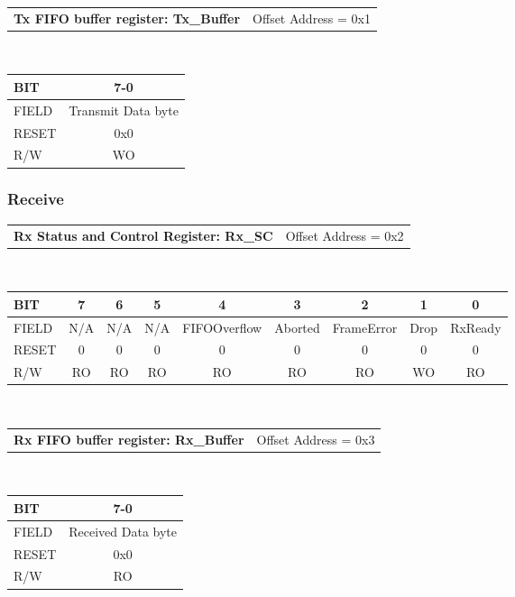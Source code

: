 \documentclass[a4paper,11pt]{article}
\begin{document}
\begin{tabular}{l l}
\textbf{Tx FIFO buffer register: Tx\_Buffer} & Offset Address = 0x1\\
\end{tabular}\\
 
\begin{tabular}{|l||c|}
\hline
\hline
BIT   & 7-0\\ 
\hline
FIELD & Transmit Data byte\\
\hline
RESET & 0x0\\
\hline
R/W   & WO\\
\hline
\end{tabular}
 
\subsubsection{Receive}
 
\begin{tabular}{l l}
\textbf{Rx Status and Control Register: Rx\_SC} & Offset Address = 0x2\\
\end{tabular}\\
 
\begin{tabular}{|l||c|c|c|c|c|c|c|c|}
\hline
\hline
BIT   & 7 & 6 & 5 & 4 & 3 & 2 & 1 & 0\\ 
\hline
FIELD &N/A &N/A &N/A & FIFOOverflow& Aborted& FrameError& Drop& RxReady\\
\hline
RESET & 0& 0& 0& 0& 0& 0& 0& 0\\
\hline
R/W   & RO& RO& RO&   RO&  RO&   RO&  WO& RO\\
\hline
\end{tabular}\\
 
 
\begin{tabular}{l l}
\textbf{Rx FIFO buffer register: Rx\_Buffer} & Offset Address = 0x3\\
\end{tabular}\\
 
\begin{tabular}{|l||c|}
\hline
\hline
BIT   & 7-0\\ 
\hline
FIELD & Received Data byte\\
\hline
RESET & 0x0\\
\hline
R/W   & RO\\
\hline
\end{tabular}\\
 
\end{document}
